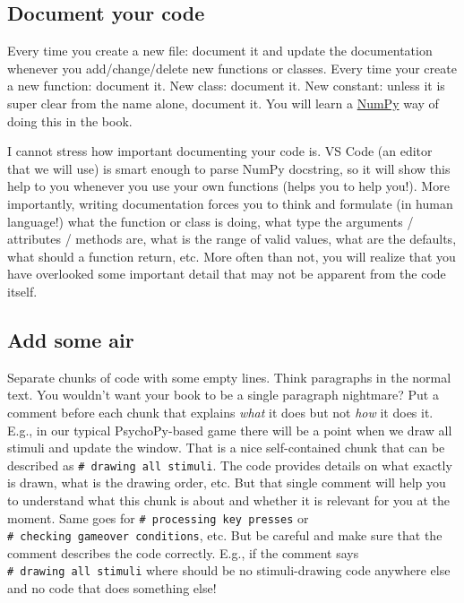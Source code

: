 \documentclass[
]{book}
\begin{document}
\hypertarget{document-your-code}{%
\subsection{Document your code}\label{document-your-code}}

Every time you create a new file: document it and update the documentation whenever you add/change/delete new functions or classes. Every time your create a new function: document it. New class: document it. New constant: unless it is super clear from the name alone, document it. You will learn a \href{https://numpydoc.readthedocs.io/en/latest/format.html}{NumPy} way of doing this in the book.

I cannot stress how important documenting your code is. VS Code (an editor that we will use) is smart enough to parse NumPy docstring, so it will show this help to you whenever you use your own functions (helps you to help you!). More importantly, writing documentation forces you to think and formulate (in human language!) what the function or class is doing, what type the arguments / attributes / methods are, what is the range of valid values, what are the defaults, what should a function return, etc. More often than not, you will realize that you have overlooked some important detail that may not be apparent from the code itself.

\hypertarget{add-some-air}{%
\subsection{Add some air}\label{add-some-air}}

Separate chunks of code with some empty lines. Think paragraphs in the normal text. You wouldn't want your book to be a single paragraph nightmare? Put a comment before each chunk that explains \emph{what} it does but not \emph{how} it does it. E.g., in our typical PsychoPy-based game there will be a point when we draw all stimuli and update the window. That is a nice self-contained chunk that can be described as \texttt{\#\ drawing\ all\ stimuli}. The code provides details on what exactly is drawn, what is the drawing order, etc. But that single comment will help you to understand what this chunk is about and whether it is relevant for you at the moment. Same goes for \texttt{\#\ processing\ key\ presses} or \texttt{\#\ checking\ gameover\ conditions}, etc. But be careful and make sure that the comment describes the code correctly. E.g., if the comment says \texttt{\#\ drawing\ all\ stimuli} where should be no stimuli-drawing code anywhere else and no code that does something else!
\end{document}
